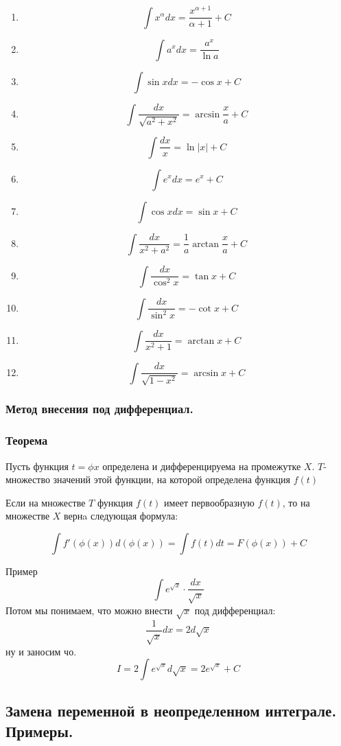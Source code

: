 \documentclass[a4paper,12pt]{article}
\theoremstyle{plain} %
\theoremstyle{definition} %
\theoremstyle{remark} %
\begin{document}
\begin{enumerate}
	\item \[ \int x^{\alpha} dx = \frac{x^{\alpha + 1}}{\alpha + 1} + C \]
	\item \[ \int a^x dx = \frac{a^x}{\ln a} \]
	\item \[ \int \sin x dx = - \cos x + C \]
	\item \[ \int \frac{dx}{\sqrt{a^2 + x^2}} = \arcsin \frac{x}{a} + C \]
	\item \[ \int \frac{dx}{x} = \ln |x| +C \]
	\item \[ \int e^x dx = e^x + C \]
	\item \[ \int \cos x dx = \sin x + C \]
	\item \[ \int \frac{dx}{x^2 + a^2} = \frac{1}{a} \arctan \frac{x}{a} +C \]
	\item \[ \int \frac{dx}{\cos^2x} = \tan x + C \]
	\item \[ \int \frac{dx}{\sin^2x} = - \cot x + C \]
	\item \[ \int \frac{dx}{x^2 + 1} = \arctan x + C \]
	\item \[ \int \frac{dx}{\sqrt{1 - x^2}} = \arcsin x + C \]
\end{enumerate}

\subsubsection*{Метод внесения под дифференциал.}

\subsubsection*{Теорема}
Пусть функция $t = \phi{x}$ определена и дифференцируема на промежутке $X$. $T$- множество значений этой функции, на которой определена функция $f(t)$

Если на множестве $T$ функция $f(t)$ имеет первообразную $f(t)$, то на множестве $X$ вернa следующая формула:

\[
	\int f'(\phi(x)) d(\phi(x)) = \int f(t) dt = F(\phi(x)) + C
\]

Пример
\[
	\int e^{\sqrt{x}} \cdot \frac{dx}{\sqrt{x}}
\]
Потом мы понимаем, что можно внести $\sqrt{x}$ под дифференциал:
\[
	\frac{1}{\sqrt{x}} dx = 2d\sqrt{x}
\]
ну и заносим чо.
\[
	I = 2 \int e^{\sqrt{x}} d \sqrt{x} = 2 e^{\sqrt{x}} + C
\]


\newpage
\subsection*{Замена переменной в неопределенном интеграле. Примеры.}
\end{document}
